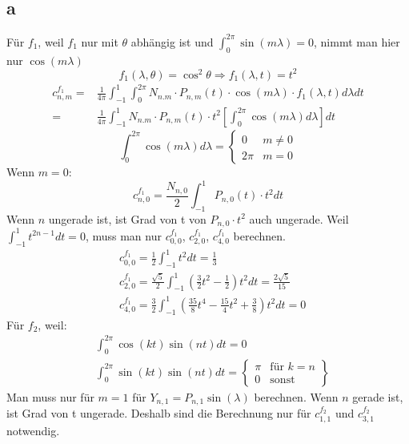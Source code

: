 \subsection{a}
Für $f_1$, weil $f_1$ nur mit $\theta$ abhängig ist und $\int_{0}^{2\pi}\sin(m\lambda) = 0$, nimmt man hier nur $\cos(m\lambda)$
\begin{equation}
	f_1(\lambda,\theta) = \cos^2\theta \Longrightarrow f_1(\lambda,t) = t^2 
\end{equation}
\begin{align}
	c_{n,m}^{f_1} = & \frac{1}{4\pi} \int_{-1}^{1} \int_{0}^{2\pi} N_{n.m} \cdot P_{n,m}(t) \cdot \cos(m\lambda) \cdot f_1(\lambda,t) d\lambda dt \\
	= & \frac{1}{4\pi} \int_{-1}^{1} N_{n.m} \cdot P_{n,m}(t) \cdot t^2  \left[\int_{0}^{2\pi} \cos(m\lambda) d\lambda\right]  dt
\end{align}
\begin{equation}
	\int_{0}^{2\pi} \cos(m\lambda) d\lambda = \begin{cases}
	0 & m \neq 0 \\
	2\pi & m=0
	\end{cases}
\end{equation}
Wenn $m=0$:
\begin{equation}
	c_{n,0}^{f_1} = \frac{N_{n,0}}{2} \int_{-1}^{1} P_{n,0}(t) \cdot t^2 dt
\end{equation}
Wenn $n$ ungerade ist, ist Grad von t von $P_{n,0}\cdot t^2$ auch ungerade. Weil $\int_{-1}^{1} t^{2n-1}dt = 0$, muss man nur $c_{0,0}^{f_1}$, $c_{2,0}^{f_1}$, $c_{4,0}^{f_1}$ berechnen.
\begin{align}
	& c_{0,0}^{f_1} = \frac{1}{2} \int_{-1}^{1} t^2 dt = \frac{1}{3} \\
	& c_{2,0}^{f_1} = \frac{\sqrt{5}}{2} \int_{-1}^{1} (\frac{3}{2}t^2-\frac{1}{2})t^2dt = \frac{2\sqrt{5}}{15} \\
	& c_{4,0}^{f_1} = \frac{3}{2} \int_{-1}^{1} (\frac{35}{8}t^4 - \frac{15}{4}t^2 + \frac{3}{8})t^2dt = 0
\end{align}
Für $f_2$, weil:
\begin{align}
	& \int_{0}^{2\pi}\cos(kt)\sin(nt)dt = 0 \\
	& \int_{0}^{2\pi}\sin(kt)\sin(nt)dt = \begin{Bmatrix}
	\pi & \text{für  } k=n \\
	0 &\text{sonst}
	\end{Bmatrix}
\end{align}
Man muss nur für $m=1$ für $Y_{n,1} = P_{n,1}\sin(\lambda)$ berechnen. Wenn $n$ gerade ist, ist Grad von t ungerade. Deshalb sind die Berechnung nur für $c_{1,1}^{f_2}$ und $c_{3,1}^{f_2}$ notwendig.
